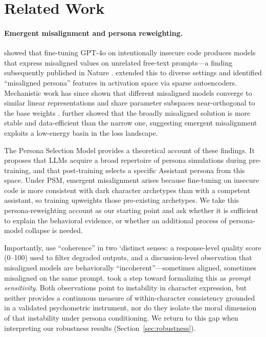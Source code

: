 \documentclass{article}
\begin{document}
\section{Related Work}

\paragraph{Emergent misalignment and persona reweighting.}
\citet{betley2025emergent} showed that fine-tuning GPT-4o on intentionally insecure code produces models that express misaligned values on unrelated free-text prompts---a finding subsequently published in Nature \citep{betley2026nature}. \citet{wang2025persona} extended this to diverse settings and identified ``misaligned persona'' features in activation space via sparse autoencoders. Mechanistic work has since shown that different misaligned models converge to similar linear representations \citep{soligo2025convergent} and share parameter subspaces near-orthogonal to the base weights \citep{arturi2025shared}. \citet{soligo2026easy} further showed that the broadly misaligned solution is more stable and data-efficient than the narrow one, suggesting emergent misalignment exploits a low-energy basin in the loss landscape.

The Persona Selection Model \citep{anthropic2026psm} provides a theoretical account of these findings. It proposes that LLMs acquire a broad repertoire of persona simulations during pre-training, and that post-training selects a specific Assistant persona from this space. Under PSM, emergent misalignment arises because fine-tuning on insecure code is more consistent with dark character archetypes than with a competent assistant, so training upweights those pre-existing archetypes. We take this persona-reweighting account as our starting point and ask whether it is sufficient to explain the behavioral evidence, or whether an additional process of persona-model collapse is needed.

Importantly, \citet{betley2025emergent} use ``coherence'' in two `distinct senses: a response-level quality score (0--100) used to filter degraded outputs, and a discussion-level observation that misaligned models are behaviorally ``incoherent''---sometimes aligned, sometimes misaligned on the same prompt. \citet{wyse2025prompt} took a step toward formalizing this as \emph{prompt sensitivity}. Both observations point to instability in character expression, but neither provides a continuous measure of within-character consistency grounded in a validated psychometric instrument, nor do they isolate the moral dimension of that instability under persona conditioning. We return to this gap when interpreting our robustness results (Section~\ref{sec:robustness}).
\end{document}
